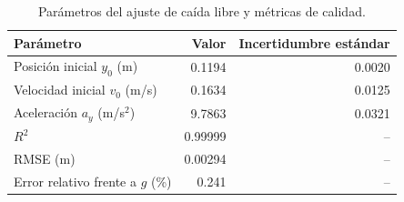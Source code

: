\begin{table}[htbp]
\centering
\caption{Parámetros del ajuste de caída libre y métricas de calidad.}
\label{tab:fit-results}
\begin{tabular}{lrr}
\hline
Parámetro & Valor & Incertidumbre estándar \\
\hline
Posición inicial $y_0$ (m) & 0.1194 & 0.0020 \\
Velocidad inicial $v_0$ (m/s) & 0.1634 & 0.0125 \\
Aceleración $a_y$ (m/s$^2$) & 9.7863 & 0.0321 \\
$R^2$ & 0.99999 & -- \\
RMSE (m) & 0.00294 & -- \\
Error relativo frente a $g$ (\%) & 0.241 & -- \\
\hline
\end{tabular}
\end{table}
